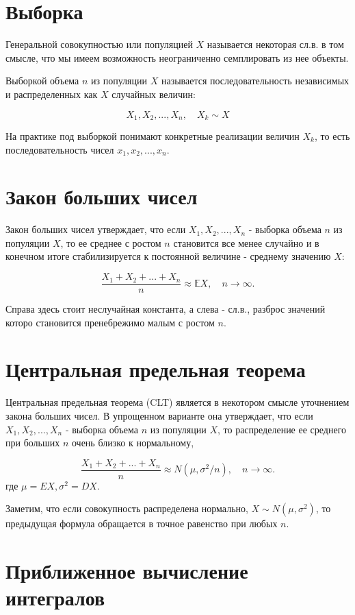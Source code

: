 \section{Выборка}

Генеральной совокупностью или популяцией $X$ называется некоторая сл.в. в том смысле, что мы имеем возможность неограниченно семплировать из нее объекты.

Выборкой объема $n$ из популяции $X$ называется последовательность независимых и распределенных как $X$ случайных величин: 

$$
X_1, X_2, ..., X_n, \quad X_k \sim X
$$

На практике под выборкой понимают конкретные реализации величин $X_k$, то есть последовательность чисел $x_1, x_2, ..., x_n$.


\section{Закон больших чисел}

Закон больших чисел утверждает, что если $X_1, X_2, ..., X_n$ - выборка объема $n$ из популяции $X$, то ее среднее с ростом $n$ становится все менее случайно и в конечном итоге стабилизируется к постоянной величине - среднему значению $X$:

$$
\frac{X_1+X_2+...+X_n}{n} \approx \mathbb{E}X, \quad n\rightarrow\infty.
$$ 

Справа здесь стоит неслучайная константа, а слева - сл.в., разброс значений которо становится пренебрежимо малым с ростом $n$.

\section{Центральная предельная теорема}

Центральная предельная теорема (CLT) является в некотором смысле уточнением закона больших чисел.
В упрощенном варианте она утверждает, что если $X_1, X_2, ..., X_n$ - выборка объема $n$ из популяции $X$, то распределение ее среднего при больших $n$ очень близко к нормальному,  

$$
\frac{X_1+X_2+...+X_n}{n} \approx N(\mu, \sigma^2/n), \quad n\rightarrow\infty.
$$
где $\mu=EX, \sigma^2=DX$.

Заметим, что если совокупность распределена нормально, $X \sim N(\mu, \sigma^2)$, то предыдущая формула обращается в 
точное равенство при любых $n$.


\section{Приближенное вычисление интегралов}

